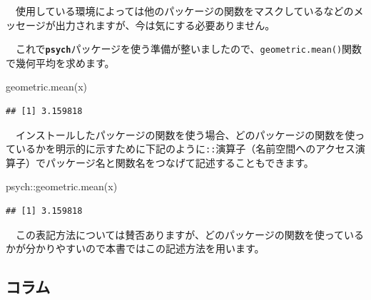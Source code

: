 \documentclass[
  12pt,
]{book}
\newenvironment{Shaded}{\begin{snugshade}}{\end{snugshade}}
\newcommand{\FunctionTok}[1]{\textcolor[rgb]{0.00,0.00,0.00}{#1}}
\newcommand{\NormalTok}[1]{#1}
\newcommand{\SpecialCharTok}[1]{\textcolor[rgb]{0.00,0.00,0.00}{#1}}
\begin{document}
　使用している環境によっては他のパッケージの関数をマスクしているなどのメッセージが出力されますが、今は気にする必要ありません。

　これで\textbf{\texttt{psych}}パッケージを使う準備が整いましたので、\texttt{geometric.mean()}関数で幾何平均を求めます。

\begin{Shaded}
\begin{Highlighting}[numbers=left,,]
\FunctionTok{geometric.mean}\NormalTok{(x)}
\end{Highlighting}
\end{Shaded}

\begin{verbatim}
## [1] 3.159818
\end{verbatim}

　インストールしたパッケージの関数を使う場合、どのパッケージの関数を使っているかを明示的に示すために下記のように\texttt{::}演算子（名前空間へのアクセス演算子）でパッケージ名と関数名をつなげて記述することもできます。

\begin{Shaded}
\begin{Highlighting}[numbers=left,,]
\NormalTok{psych}\SpecialCharTok{::}\FunctionTok{geometric.mean}\NormalTok{(x)}
\end{Highlighting}
\end{Shaded}

\begin{verbatim}
## [1] 3.159818
\end{verbatim}

　この表記方法については賛否ありますが、どのパッケージの関数を使っているかが分かりやすいので本書ではこの記述方法を用います。

\hypertarget{ux30b3ux30e9ux30e0}{%
\subsection*{コラム}\label{ux30b3ux30e9ux30e0}}
\end{document}
